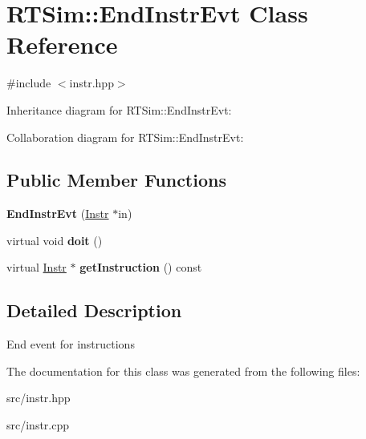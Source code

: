 \hypertarget{classRTSim_1_1EndInstrEvt}{}\section{R\+T\+Sim\+:\+:End\+Instr\+Evt Class Reference}
\label{classRTSim_1_1EndInstrEvt}


{\ttfamily \#include $<$instr.\+hpp$>$}



Inheritance diagram for R\+T\+Sim\+:\+:End\+Instr\+Evt\+:


Collaboration diagram for R\+T\+Sim\+:\+:End\+Instr\+Evt\+:
\subsection*{Public Member Functions}
\begin{DoxyCompactItemize}
\item 
{\bfseries End\+Instr\+Evt} (\hyperlink{classRTSim_1_1Instr}{Instr} $\ast$in)\hypertarget{classRTSim_1_1EndInstrEvt_abb485f300a2696dfa92b4ac8eaabd147}{}\label{classRTSim_1_1EndInstrEvt_abb485f300a2696dfa92b4ac8eaabd147}

\item 
virtual void {\bfseries doit} ()\hypertarget{classRTSim_1_1EndInstrEvt_a70b86173eb390c2514c080d19db09fae}{}\label{classRTSim_1_1EndInstrEvt_a70b86173eb390c2514c080d19db09fae}

\item 
virtual \hyperlink{classRTSim_1_1Instr}{Instr} $\ast$ {\bfseries get\+Instruction} () const \hypertarget{classRTSim_1_1EndInstrEvt_a9ce7d67994bb0be7cb0e63cd6674c614}{}\label{classRTSim_1_1EndInstrEvt_a9ce7d67994bb0be7cb0e63cd6674c614}

\end{DoxyCompactItemize}


\subsection{Detailed Description}
End event for instructions 

The documentation for this class was generated from the following files\+:\begin{DoxyCompactItemize}
\item 
src/instr.\+hpp\item 
src/instr.\+cpp\end{DoxyCompactItemize}

